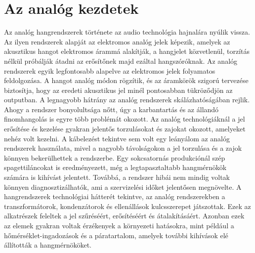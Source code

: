 \section{Az analóg kezdetek} %
Az analóg hangrendszerek története az audio technológia hajnalára nyúlik vissza. 
Az ilyen rendszerek alapját az elektromos analóg jelek képezik, amelyek az akusztikus hangot elektromos árammá alakítják,
a hangjelet közvetlenül, torzítás nélkül próbálják átadni az erősítőnek majd ezáltal hangszóróknak.
Az analóg rendszerek egyik legfontosabb alapelve az elektromos jelek folyamatos feldolgozása. 
A hangot analóg módon rögzítik, és az áramkörök szigorú tervezése biztosítja, hogy az eredeti akusztikus jel minél pontosabban tükröződjön az outputban.
A legnagyobb hátrány az analóg rendszerek skálázhatóságában rejlik. 
Ahogy a rendszer bonyolultsága nőtt, úgy a karbantartás és az állandó finomhangolás is egyre több problémát okozott. 
Az analóg technológiáknál a jel erősítése és kezelése gyakran jelentős torzulásokat és zajokat okozott, amelyeket nehéz volt kezelni.
A kábelezést tekintve sem volt egy leányálom az analóg rendszerek használata, mivel a nagyobb távolságokon a jel torzulása és a zajok könnyen bekerülhettek a rendszerbe.
Egy sokcsatornás produkciónál szép spagettiláncokat is eredményezett, még a legtapasztaltabb hangmérnökök számára is kihívást jelentett. 
Továbbá, a rendszer hibái nem mindig voltak könnyen diagnosztizálhatók, ami a szervizelési időket jelentősen megnövelte.
A hangrendszerek technológiai hátterét tekintve, az analóg rendszerekben a transzformátorok, kondenzátorok és ellenállások kulcsszerepet játszottak. 
Ezek az alkatrészek feleltek a jel szűréséért, erősítéséért és átalakításáért. 
Azonban ezek az elemek gyakran voltak érzékenyek a környezeti hatásokra, mint például a hőmérséklet-ingadozások és a páratartalom, 
amelyek további kihívások elé állították a hangmérnököket.


